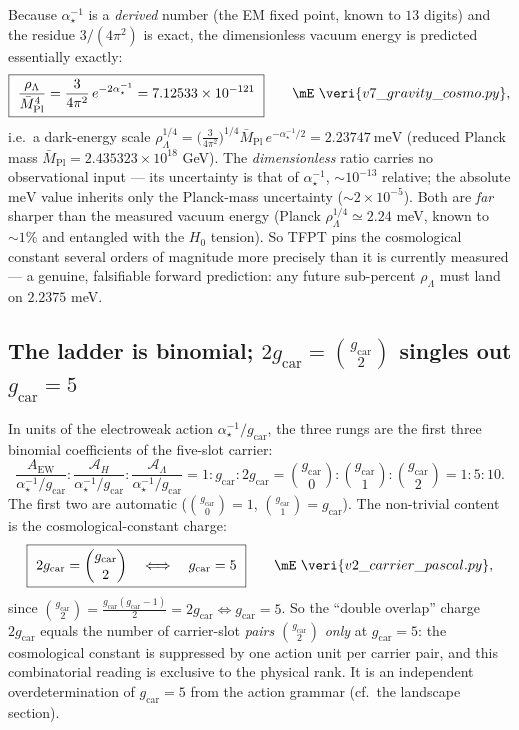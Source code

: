 \documentclass[11pt,a4paper]{article}
\newcommand{\Mbar}{\bar M_{\mathrm{Pl}}}
\newcommand{\gcar}{g_{\mathrm{car}}}
\newcommand{\ainv}{\alpha^{-1}_\star}
\newcommand{\AEW}{A_{\mathrm{EW}}}
\newcommand{\AL}{\mathcal A_\Lambda}
\newcommand{\AH}{\mathcal A_H}
\theoremstyle{definition}
\begin{document}
\begin{winbox}
Because $\ainv$ is a \emph{derived} number (the EM fixed point, known to $13$ digits) and the residue
$3/(4\pi^2)$ is exact, the dimensionless vacuum energy is predicted essentially exactly:
\begin{equation}
  \boxed{\ \frac{\rho_\Lambda}{\Mbar^4}=\frac{3}{4\pi^2}\,e^{-2\ainv}=7.12533\times10^{-121}\ }\qquad\mE\ \veri{v7\_gravity\_cosmo.py} ,
\end{equation}
i.e.\ a dark-energy scale
$\rho_\Lambda^{1/4}=\bigl(\tfrac{3}{4\pi^2}\bigr)^{1/4}\Mbar\,e^{-\ainv/2}=2.23747\ \mathrm{meV}$
(reduced Planck mass $\Mbar=2.435323\times10^{18}$ GeV). The \emph{dimensionless} ratio carries no
observational input --- its uncertainty is that of $\ainv$, $\sim10^{-13}$ relative; the absolute
$\mathrm{meV}$ value inherits only the Planck-mass uncertainty ($\sim2\times10^{-5}$). Both are
\emph{far} sharper than the measured vacuum energy (Planck $\rho_\Lambda^{1/4}\simeq2.24$ meV, known to
$\sim1\%$ and entangled with the $H_0$ tension). So TFPT pins the cosmological constant several orders of
magnitude more precisely than it is currently measured --- a genuine, falsifiable forward prediction:
any future sub-percent $\rho_\Lambda$ must land on $2.2375$ meV.
\end{winbox}

\subsection{The ladder is binomial; $2\gcar=\binom{\gcar}{2}$ singles out $\gcar=5$}

In units of the electroweak action $\ainv/\gcar$, the three rungs are the first three binomial
coefficients of the five-slot carrier:
\begin{equation}
  \frac{\AEW}{\ainv/\gcar}:\frac{\AH}{\ainv/\gcar}:\frac{\AL}{\ainv/\gcar}
  =1:\gcar:2\gcar
  =\binom{\gcar}{0}:\binom{\gcar}{1}:\binom{\gcar}{2}
  =1:5:10 .
\end{equation}
The first two are automatic ($\binom{\gcar}{0}=1$, $\binom{\gcar}{1}=\gcar$). The non-trivial content
is the cosmological-constant charge:
\begin{equation}
  \boxed{\ 2\gcar=\binom{\gcar}{2}\quad\Longleftrightarrow\quad \gcar=5\ }\qquad\mE\ \veri{v2\_carrier\_pascal.py},
\end{equation}
since $\binom{\gcar}{2}=\tfrac{\gcar(\gcar-1)}{2}=2\gcar\iff\gcar=5$. So the ``double overlap'' charge
$2\gcar$ equals the number of carrier-slot \emph{pairs} $\binom{\gcar}{2}$ \emph{only} at $\gcar=5$:
the cosmological constant is suppressed by one action unit per carrier pair, and this combinatorial
reading is exclusive to the physical rank. It is an independent overdetermination of $\gcar=5$ from
the action grammar (cf.\ the landscape section).
\end{document}
